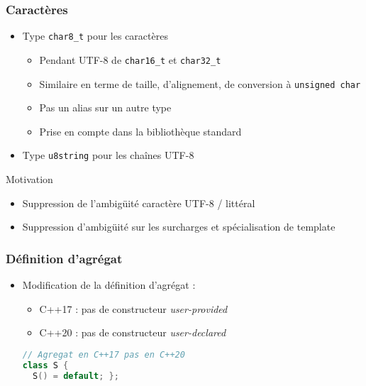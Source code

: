 \documentclass[C++.tex]{subfiles}
\begin{document}
\begin{frame}[fragile]
	\frametitle{Caractères}
	\begin{itemize}
		\item Type \lstinline|char8_t| pour les caractères
		\begin{itemize}
			\item Pendant UTF-8 de \lstinline|char16_t| et \lstinline|char32_t|
			\item Similaire en terme de taille, d'alignement, de conversion à \lstinline|unsigned char|
			\item Pas un alias sur un autre type
			\item Prise en compte dans la bibliothèque standard
		\end{itemize}
		\item Type \lstinline|u8string| pour les chaînes UTF-8
	\end{itemize}

	\begin{block}{Motivation}
		\begin{itemize}
			\item Suppression de l'ambigüité caractère UTF-8 / littéral


			\item Suppression d'ambigüité sur les surcharges et spécialisation de template
		\end{itemize}
	\end{block}
\end{frame}

\begin{frame}[fragile]
	\frametitle{Définition d'agrégat}
	\begin{itemize}
		\item Modification de la définition d'agrégat :
		\begin{itemize}
			\item C++17 : pas de constructeur \textit{user-provided}
			\item C++20 : pas de constructeur \textit{user-declared}

		\end{itemize}
	
		\begin{lstlisting}[language=C++]
// Agregat en C++17 pas en C++20
class S {
  S() = default; };\end{lstlisting}
	\end{itemize}
\end{frame}
\end{document}
